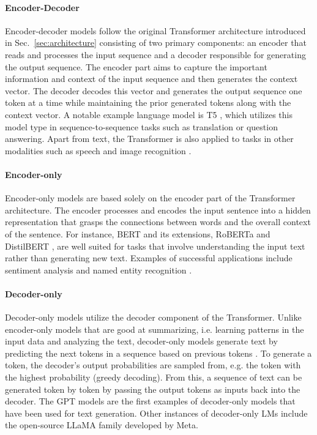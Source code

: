 \paragraph{Encoder-Decoder}
Encoder-decoder models follow the original Transformer architecture introduced
in Sec.~\ref{sec:architecture} consisting of two primary components: an encoder
that reads and processes the input sequence and a decoder responsible for
generating the output sequence. The encoder part aims to capture the important
information and context of the input sequence and then generates the context
vector. The decoder decodes this vector and generates the output sequence one
token at a time while maintaining the prior generated tokens along with the
context vector. A notable example language model is T5
\cite{raffel2020exploring}, which utilizes this model type in
sequence-to-sequence tasks such as translation or question answering. Apart from
text, the Transformer is also applied to tasks in other modalities such as
speech \cite{toshniwal2018comparison} and image recognition
\cite{dosovitskiy2021image}.

\paragraph{Encoder-only}
Encoder-only models are based solely on the encoder part of the Transformer
architecture. The encoder processes and encodes the input sentence into a hidden
representation that grasps the connections between words and the overall context
of the sentence. For instance, BERT \cite{devlin2019bert} and its extensions,
RoBERTa \cite{liu2019roberta} and DistilBERT \cite{sanh2019distilbert}, are well
suited for tasks that involve understanding the input text rather than
generating new text. Examples of successful applications include sentiment
analysis \cite{yuan2023revisiting,clark2020electra} and named entity recognition
\cite{wu2020scalable, zhang2022knowledge}.

\paragraph{Decoder-only}
Decoder-only models utilize the decoder component of the Transformer. Unlike
encoder-only models that are good at summarizing, i.e. learning patterns in the
input data and analyzing the text, decoder-only models generate text by
predicting the next tokens in a sequence based on previous tokens
\cite{radford2018improving}. To generate a token, the decoder's output
probabilities are sampled from, e.g. the token with the highest probability
(greedy decoding). From this, a sequence of text can be generated token by token
by passing the output tokens as inputs back into the decoder. The GPT models
\cite{radford2019gpt2, brown2020language, achiam2023gpt} are the first examples
of decoder-only models that have been used for text generation. Other instances
of decoder-only LMs include the open-source LLaMA family
\cite{touvron2023llama1, touvron2023llama2, dubey2024llama3} developed by Meta.
